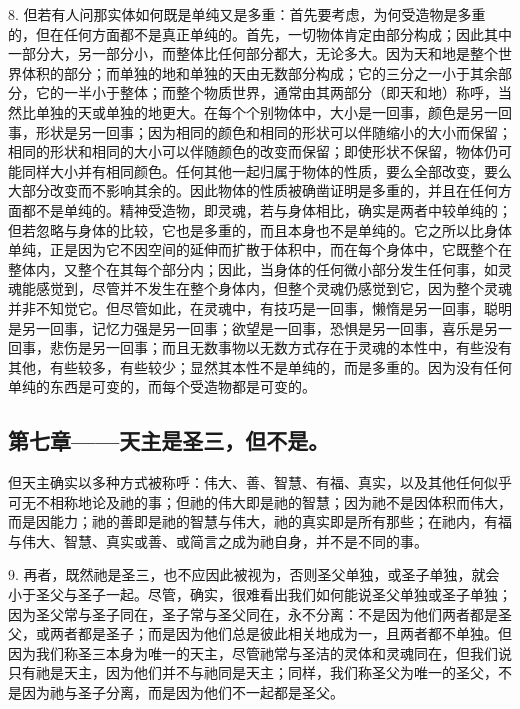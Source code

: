 8. 但若有人问那实体如何既是单纯又是多重：首先要考虑，为何受造物是多重的，但在任何方面都不是真正单纯的。首先，一切物体肯定由部分构成；因此其中一部分大，另一部分小，而整体比任何部分都大，无论多大。因为天和地是整个世界体积的部分；而单独的地和单独的天由无数部分构成；它的三分之一小于其余部分，它的一半小于整体；而整个物质世界，通常由其两部分（即天和地）称呼，当然比单独的天或单独的地更大。在每个个别物体中，大小是一回事，颜色是另一回事，形状是另一回事；因为相同的颜色和相同的形状可以伴随缩小的大小而保留；相同的形状和相同的大小可以伴随颜色的改变而保留；即使形状不保留，物体仍可能同样大小并有相同颜色。任何其他一起归属于物体的性质，要么全部改变，要么大部分改变而不影响其余的。因此物体的性质被确凿证明是多重的，并且在任何方面都不是单纯的。精神受造物，即灵魂，若与身体相比，确实是两者中较单纯的；但若忽略与身体的比较，它也是多重的，而且本身也不是单纯的。它之所以比身体单纯，正是因为它不因空间的延伸而扩散于体积中，而在每个身体中，它既整个在整体内，又整个在其每个部分内；因此，当身体的任何微小部分发生任何事，如灵魂能感觉到，尽管并不发生在整个身体内，但整个灵魂仍感觉到它，因为整个灵魂并非不知觉它。但尽管如此，在灵魂中，有技巧是一回事，懒惰是另一回事，聪明是另一回事，记忆力强是另一回事；欲望是一回事，恐惧是另一回事，喜乐是另一回事，悲伤是另一回事；而且无数事物以无数方式存在于灵魂的本性中，有些没有其他，有些较多，有些较少；显然其本性不是单纯的，而是多重的。因为没有任何单纯的东西是可变的，而每个受造物都是可变的。\par


\subsection{第七章——天主是圣三，但不是。}

但天主确实以多种方式被称呼：伟大、善、智慧、有福、真实，以及其他任何似乎可无不相称地论及祂的事；但祂的伟大即是祂的智慧；因为祂不是因体积而伟大，而是因能力；祂的善即是祂的智慧与伟大，祂的真实即是所有那些；在祂内，有福与伟大、智慧、真实或善、或简言之成为祂自身，并不是不同的事。\par

9. 再者，既然祂是圣三，也不应因此被视为，否则圣父单独，或圣子单独，就会小于圣父与圣子一起。尽管，确实，很难看出我们如何能说圣父单独或圣子单独；因为圣父常与圣子同在，圣子常与圣父同在，永不分离：不是因为他们两者都是圣父，或两者都是圣子；而是因为他们总是彼此相关地成为一，且两者都不单独。但因为我们称圣三本身为唯一的天主，尽管祂常与圣洁的灵体和灵魂同在，但我们说只有祂是天主，因为他们并不与祂同是天主；同样，我们称圣父为唯一的圣父，不是因为祂与圣子分离，而是因为他们不一起都是圣父。\par

